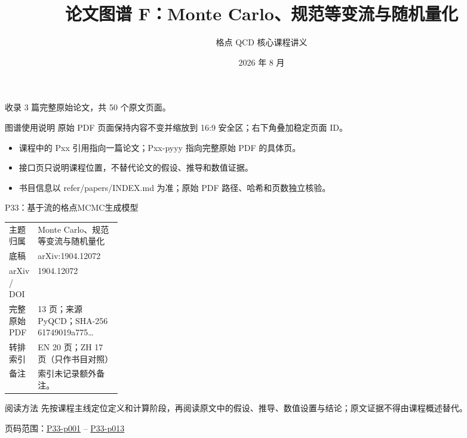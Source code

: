 \documentclass[aspectratio=169,10pt]{ctexbeamer}
\title{论文图谱 F：Monte Carlo、规范等变流与随机量化}
\author{格点 QCD 核心课程讲义}
\date{2026 年 8 月}
\begin{document}
\begin{frame}[plain]\titlepage
\vfill\centering 收录 3 篇完整原始论文，共 50 个原文页面。
\end{frame}
\begin{frame}[t]{图谱使用说明}
\small 原始 PDF 页面保持内容不变并缩放到 16:9 安全区；右下角叠加稳定页面 ID。
\begin{itemize}
\item 课程中的 Pxx 引用指向一篇论文；Pxx-pyyy 指向完整原始 PDF 的具体页。
\item 接口页只说明课程位置，不替代论文的假设、推导和数值证据。
\item 书目信息以 refer/papers/INDEX.md 为准；原始 PDF 路径、哈希和页数独立核验。
\end{itemize}\end{frame}
\begin{frame}[t]{P33：基于流的格点MCMC生成模型}
\small\begin{tabularx}{\linewidth}{p{0.22\linewidth}Y}
\toprule 主题归属 & Monte Carlo、规范等变流与随机量化\\
底稿 & arXiv:1904.12072\\
arXiv / DOI & 1904.12072\\
完整原始 PDF & 13 页；来源 PyQCD；SHA-256 61749019a775\ldots\\
转排索引 & EN 20 页；ZH 17 页（只作书目对照）\\
备注 & 索引未记录额外备注。\\
\bottomrule\end{tabularx}\vspace{0.25cm}
\begin{block}{阅读方法}
先按课程主线定位定义和计算阶段，再阅读原文中的假设、推导、数值设置与结论；原文证据不得由课程概述替代。
\end{block}
\vfill 页码范围：\hyperlink{P33-p001}{P33-p001} -- \hyperlink{P33-p013}{P33-p013}
\end{frame}
\end{document}
